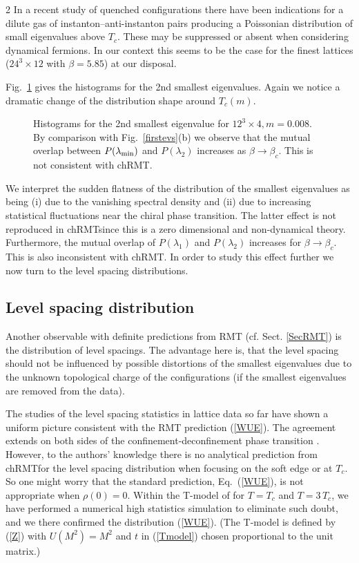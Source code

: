 \begin{multicols}{2}
In a recent study of quenched configurations \cite{EdHeKi99a} there have been
indications for a dilute gas of  instanton--anti-instanton pairs producing a
Poissonian distribution of small eigenvalues above $T_c$.  These may be
suppressed or absent when considering dynamical fermions. In our context this
seems to be the case for the finest lattices ($24^3\times 12$ with
$\beta=5.85$) at our disposal.

Fig.~\ref{secondevs} gives the histograms for the 2nd smallest eigenvalues.
Again we notice a dramatic change of the distribution shape around $T_c(m)$.

\begin{figure}[h]
\centerline{}
\caption{Histograms for the 2nd smallest eigenvalue for
$12^3\times 4, m=0.008$. By comparison with Fig.~\ref{firstevs}(b) we observe that the mutual
overlap between $P(\lambda_{\rm min})$ and $P(\lambda_2)$ increases as
$\beta  \to\beta_c$. This is not consistent with chRMT.}
\label{secondevs}
\end{figure}

We interpret the sudden flatness of the distribution of the smallest
eigenvalues as being (i) due to the vanishing spectral density and (ii) due to
increasing statistical fluctuations near the chiral phase transition. The
latter effect is not reproduced in chRMT\space since this is a zero dimensional
and non-dynamical theory. Furthermore, the mutual overlap of $P(\lambda_1)$ and
$P(\lambda_2)$ increases for $\beta\to\beta_c$.  This is also inconsistent with
chRMT. In order to study this effect further we now turn to the level spacing
distributions. 



\subsection{Level spacing distribution}


Another observable with definite predictions from RMT (cf. Sect. \ref{SecRMT})
is the distribution of level spacings. The advantage here is, that the level
spacing should not be influenced by possible distortions of the smallest
eigenvalues due to the unknown topological charge of the configurations (if the
smallest eigenvalues are removed from the data).

The studies of the level spacing statistics in lattice data so far have
shown a uniform picture consistent with the RMT prediction (\ref{WUE}).
The agreement extends on both sides of the confinement-deconfinement phase
transition \cite{PuRaWe98,BeMaPu99}.  However, to the authors' knowledge
there is no analytical prediction from chRMT\space for the level spacing
distribution when focusing on the soft edge or at $T_c$. 
So one might
worry that the standard prediction, Eq.~(\ref{WUE}), is not appropriate
when $\rho(0)=0$.  Within the T-model of \cite{JaVe96} for $T=T_c$ and
$T=3\,T_c$, we have performed a numerical high statistics simulation to
eliminate such doubt, and we there confirmed the distribution (\ref{WUE}).
(The T-model is defined by (\ref{Z}) with $U(M^2)=M^2$ and $t$ in
(\ref{Tmodel}) chosen proportional to the unit matrix.) 


\end{multicols}
